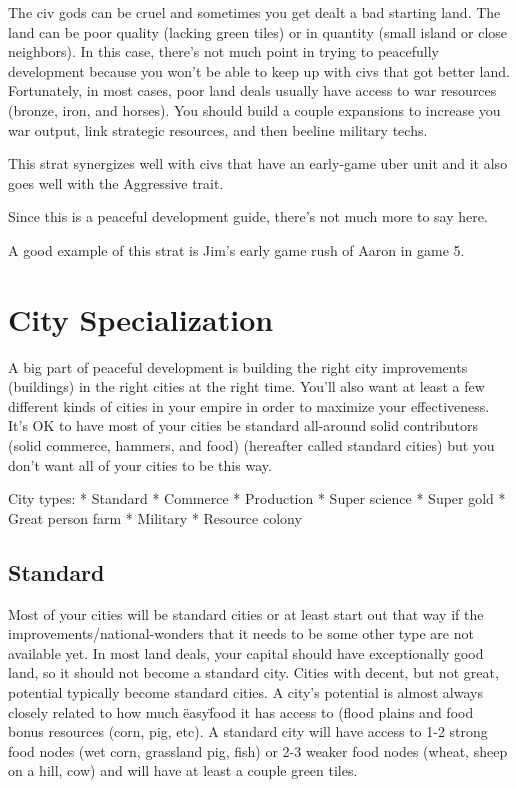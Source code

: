 \documentclass[10pt]{article}
\begin{document}
The civ gods can be cruel and sometimes you get dealt a bad starting land. The land can be poor quality (lacking
green tiles) or in quantity (small island or close neighbors). In this case, there's not much point in trying
to peacefully development because you won't be able to keep up with civs that got better land. Fortunately, in most cases,
poor land deals usually have access to war resources (bronze, iron, and horses). You should build a couple expansions
to increase you war output, link strategic resources, and then beeline military techs.

This strat synergizes well with civs that have an early-game uber unit and it also goes well with the Aggressive trait.

Since this is a peaceful development guide, there's not much more to say here.

A good example of this strat is Jim's early game rush of Aaron in game 5.

\section*{City Specialization}

A big part of peaceful development is building the right city improvements (buildings)
in the right cities at the right time. You'll also want at least a few different
kinds of cities in your empire in order to maximize your effectiveness. It's OK
to have most of your cities be standard all-around solid contributors (solid commerce,
hammers, and food) (hereafter called standard cities) but you don't want all of
your cities to be this way.

City types:
* Standard
* Commerce
* Production
* Super science
* Super gold
* Great person farm
* Military
* Resource colony

\subsection*{Standard}

Most of your cities will be standard cities or at least start out that
way if the improvements/national-wonders that it needs to be some other type
are not available yet. In most land deals, your capital should have exceptionally
good land, so it should not become a standard city. Cities with decent, but not
great, potential typically become standard cities. A city's potential is almost
always closely related to how much \"easy\" food it has access to (flood plains
and food bonus resources (corn, pig, etc). A standard city will have access to
1-2 strong food nodes (wet corn, grassland pig, fish) or 2-3 weaker food nodes
(wheat, sheep on a hill, cow) and will have at least a couple green tiles.
\end{document}

